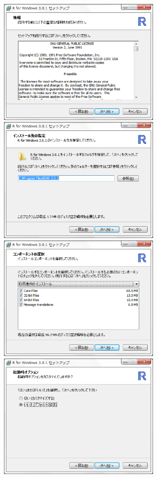\documentclass[a4paper,10pt,fleqn]{jarticle}
\begin{document}
\includegraphics[width=8cm]{img/windows/win004.eps}\hspace{0.8em} \includegraphics[width=8cm]{img/windows/win005.eps}\\

\includegraphics[width=8cm]{img/windows/win006.eps}\hspace{0.8em} \includegraphics[width=8cm]{img/windows/win007.eps}\\
\end{document}
